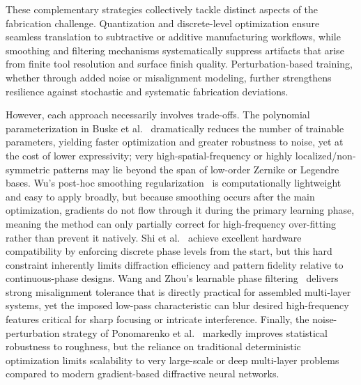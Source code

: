 \documentclass[12pt]{article}
\begin{document}
These complementary strategies collectively tackle distinct aspects of the fabrication challenge. Quantization and discrete-level optimization ensure seamless translation to subtractive or additive manufacturing workflows, while smoothing and filtering mechanisms systematically suppress artifacts that arise from finite tool resolution and surface finish quality. Perturbation-based training, whether through added noise or misalignment modeling, further strengthens resilience against stochastic and systematic fabrication deviations. 

However, each approach necessarily involves trade-offs. The polynomial parameterization in Buske et al.~\cite{buske2025diffractive} dramatically reduces the number of trainable parameters, yielding faster optimization and greater robustness to noise, yet at the cost of lower expressivity; very high-spatial-frequency or highly localized/non-symmetric patterns may lie beyond the span of low-order Zernike or Legendre bases. Wu's post-hoc smoothing regularization~\cite{wu2024phase} is computationally lightweight and easy to apply broadly, but because smoothing occurs after the main optimization, gradients do not flow through it during the primary learning phase, meaning the method can only partially correct for high-frequency over-fitting rather than prevent it natively. Shi et al.~\cite{shi2021robust} achieve excellent hardware compatibility by enforcing discrete phase levels from the start, but this hard constraint inherently limits diffraction efficiency and pattern fidelity relative to continuous-phase designs. Wang and Zhou's learnable phase filtering~\cite{wang2025misalignment} delivers strong misalignment tolerance that is directly practical for assembled multi-layer systems, yet the imposed low-pass characteristic can blur desired high-frequency features critical for sharp focusing or intricate interference. Finally, the noise-perturbation strategy of Ponomarenko et al.~\cite{ponomarenko2019phase} markedly improves statistical robustness to roughness, but the reliance on traditional deterministic optimization limits scalability to very large-scale or deep multi-layer problems compared to modern gradient-based diffractive neural networks.
\end{document}

